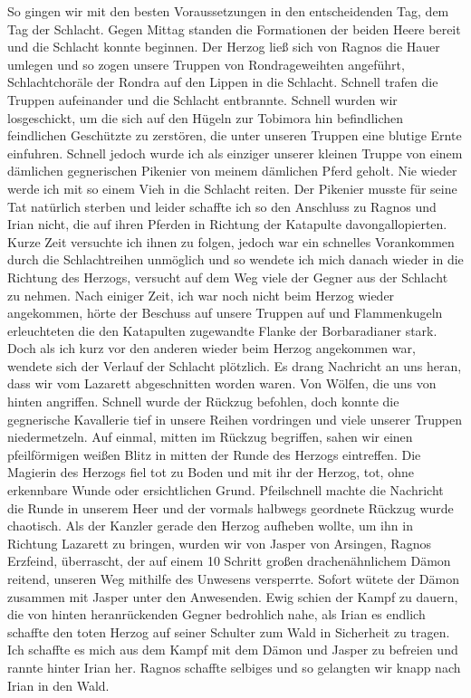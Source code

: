 So gingen wir mit den besten Voraussetzungen in den entscheidenden Tag, dem Tag der Schlacht. Gegen Mittag standen die Formationen der beiden Heere bereit und die Schlacht konnte beginnen. Der Herzog ließ sich von Ragnos die Hauer umlegen und so zogen unsere Truppen von Rondrageweihten angeführt, Schlachtchoräle der Rondra auf den Lippen in die Schlacht. Schnell trafen die Truppen aufeinander und die Schlacht entbrannte. Schnell wurden wir losgeschickt, um die sich auf den Hügeln zur Tobimora hin befindlichen feindlichen Geschützte zu zerstören, die unter unseren Truppen eine blutige Ernte einfuhren. Schnell jedoch wurde ich als einziger unserer kleinen Truppe von einem dämlichen gegnerischen Pikenier von meinem dämlichen Pferd geholt. Nie wieder werde ich mit so einem Vieh in die Schlacht reiten. Der Pikenier musste für seine Tat natürlich sterben und leider schaffte ich so den Anschluss zu Ragnos und Irian nicht, die auf ihren Pferden in Richtung der Katapulte davongallopierten. Kurze Zeit versuchte ich ihnen zu folgen, jedoch war ein schnelles Vorankommen durch die Schlachtreihen unmöglich und so wendete ich mich danach wieder in die Richtung des Herzogs, versucht auf dem Weg viele der Gegner aus der Schlacht zu nehmen. Nach einiger Zeit, ich war noch nicht beim Herzog wieder angekommen, hörte der Beschuss auf unsere Truppen auf und Flammenkugeln erleuchteten die den Katapulten zugewandte Flanke der Borbaradianer stark. Doch als ich kurz vor den anderen wieder beim Herzog angekommen war, wendete sich der Verlauf der Schlacht plötzlich. Es drang Nachricht an uns heran, dass wir vom Lazarett abgeschnitten worden waren. Von Wölfen, die uns von hinten angriffen. Schnell wurde der Rückzug befohlen, doch konnte die gegnerische Kavallerie tief in unsere Reihen vordringen und viele unserer Truppen niedermetzeln. Auf einmal, mitten im Rückzug begriffen, sahen wir einen pfeilförmigen weißen Blitz in mitten der Runde des Herzogs eintreffen. Die Magierin des Herzogs fiel tot zu Boden und mit ihr der Herzog, tot, ohne erkennbare Wunde oder ersichtlichen Grund. Pfeilschnell machte die Nachricht die Runde in unserem Heer und der vormals halbwegs geordnete Rückzug wurde chaotisch. Als der Kanzler gerade den Herzog aufheben wollte, um ihn in Richtung Lazarett zu bringen, wurden wir von Jasper von Arsingen, Ragnos Erzfeind, überrascht, der auf einem 10 Schritt großen drachenähnlichem Dämon reitend, unseren Weg mithilfe des Unwesens versperrte. Sofort wütete der Dämon zusammen mit Jasper unter den Anwesenden. Ewig schien der Kampf zu dauern, die von hinten heranrückenden Gegner bedrohlich nahe, als Irian es endlich schaffte den toten Herzog auf seiner Schulter zum Wald in Sicherheit zu tragen. Ich schaffte es mich aus dem Kampf mit dem Dämon und Jasper zu befreien und rannte hinter Irian her. Ragnos schaffte selbiges und so gelangten wir knapp nach Irian in den Wald.

